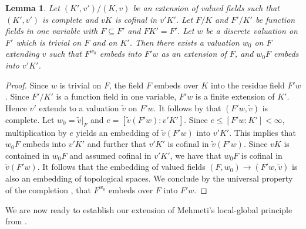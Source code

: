 \documentclass[12pt,leqno]{amsart}
\renewcommand{\leq}{\leqslant}
\numberwithin{equation}{section}
\newtheorem{lem}[equation]{Lemma}
\theoremstyle{definition}
\theoremstyle{plain}
\begin{document}
\begin{lem}\label{L:HenselianToComplete2}
Let $(K',v')/(K,v)$ be an extension of valued fields such that $(K', v')$ is complete and $vK$ is cofinal in $v'K'$.
Let $F/K$ and $F'/K'$ be function fields in one variable with $F \subseteq F'$ and $FK' = F'$.
Let $w$ be a discrete valuation on $F'$ which is trivial on $F$ and on $K'$.
Then there exists a valuation $w_0$ on $F$ extending $v$ such that $F^{w_0}$ embeds into $F'w$ as an extension of $F$, and $w_0F$ embeds into $v'K'$.
\end{lem}
\begin{proof}
Since $w$ is trivial on $F$, the field $F$ embeds over $K$ into the residue field $F'w$.
Since $F'/K'$ is a function field in one variable, $F'w$ is a finite extension of $K'$. 
Hence $v'$ extends to a valuation $\tilde{v}$ on $F'w$.
It follows by  that 
$(F'w,\tilde{v})$ is complete.
Let $w_0 = \tilde{v}\vert_{F}$ and 
$e=[\tilde{v}(F'w):v'K']$.
Since $e\leq [F'w:K']<\infty$,
multiplication by $e$ yields an embedding of $\tilde{v}(F'w)$ into $v'K'$.
This implies that $w_0F$ embeds into $v'K'$ and further that  $v'K'$ is cofinal in $\tilde{v}(F'w)$.
Since $vK$ is contained in $w_0F$ and assumed cofinal in $v'K'$, we have that $w_0F$ is cofinal in $\tilde{v}(F'w)$.
It follows that the embedding of valued fields $(F, w_0) \to (F'w, \tilde{v})$ is also an embedding of topological spaces.
We conclude by the universal property of the completion \cite[Theorem 2.4.3]{EP05}, that $F^{w_0}$ embeds over $F$ into $F'w$.
\end{proof}

We are now ready to establish our extension of Mehmeti's local-global principle from \cite{Meh19}.
\end{document}
